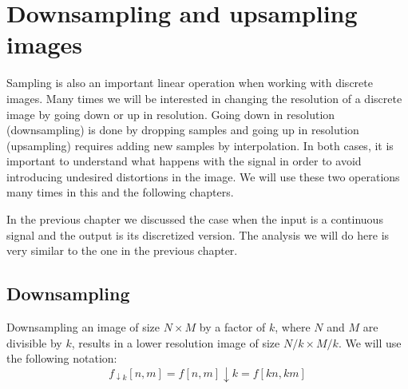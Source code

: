 \chapter{Downsampling and upsampling images}

Sampling is also an important linear operation when working with discrete images. Many times we will be interested in changing the resolution of a discrete image by going down or up in resolution. Going down in resolution (downsampling) is done by dropping samples and going up in resolution (upsampling) requires adding new samples by interpolation. In both cases, it is important to understand what happens with the signal in order to avoid introducing undesired distortions in the image. We will use these two operations many times in this and the following chapters. 

In the previous chapter we discussed the case when the input is a continuous signal and the output is its discretized version. The analysis we will do here is very similar to the one in the previous chapter. 

\section{Downsampling}

Downsampling an image of size $N \times M$ by a factor of $k$, where $N$ and $M$ are divisible by $k$, results in a lower resolution image of size $N/k \times M/k$. We will use the following notation:
\begin{equation}
f_{\downarrow k} \left[n,m\right]   = f\left[n,m\right] \downarrow k = f\left[kn,km\right]
\end{equation}


